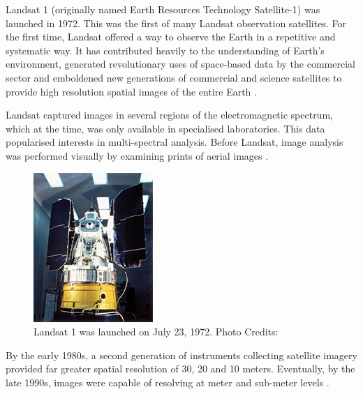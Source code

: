 Landsat 1 (originally named Earth Resources Technology Satellite-1) was launched in 1972. This was the first of many Landsat observation satellites. For the first time, Landsat
offered a way to observe the Earth in a repetitive and systematic way. It has contributed heavily to the understanding of Earth's environment, generated revolutionary uses of space-based data by the commercial sector and emboldened new generations of commercial and science satellites to provide high resolution spatial images of the entire Earth \cite{campbell2011introduction, Williams:2006:0099-1112:1171}.

\par

Landsat captured images in several regions of the electromagnetic spectrum, which at the time, was only available in specialised laboratories. This data popularised interests in multi-spectral analysis. Before Landsat, image analysis was performed visually by examining prints of aerial images \cite{campbell2011introduction}.

\begin{figure}[H]
\centering

\includegraphics[totalheight=0.2\textheight]{Landsat1.jpg}
\caption{Landsat 1 was launched on July 23, 1972. Photo Credits: \cite{landsat1}
}
\label{Fig:LANDSAT}
\end{figure}

By the early 1980s, a second generation of instruments collecting satellite imagery provided far greater spatial resolution of 30, 20 and 10 meters. Eventually, by the late 1990s, images were capable of resolving at meter and  sub-meter levels \cite{campbell2011introduction}.

\par


